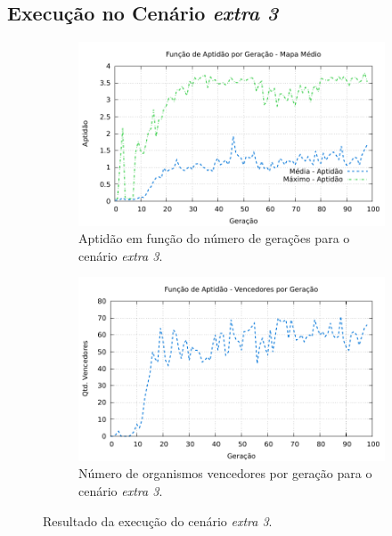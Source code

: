 
\subsection{Execução no Cenário \textit{extra 3}}


\begin{figure}[H]
\centering
	\begin{subfigure}[b]{0.4\textwidth}
        \includegraphics[width=\textwidth]{fig/extra3-fitness.pdf}
        \caption{Aptidão em função do número de gerações para o cenário
        \textit{extra 3}.}
	\end{subfigure}
	\begin{subfigure}[b]{0.4\textwidth}
        \includegraphics[width=\textwidth]{fig/extra3-winners.pdf}
        \caption{Número de organismos vencedores por geração para o cenário
        \textit{extra 3}.}
	\end{subfigure}

    \caption{Resultado da execução do cenário \textit{extra 3}.}
	\label{fig:extra3-results}
\end{figure}

